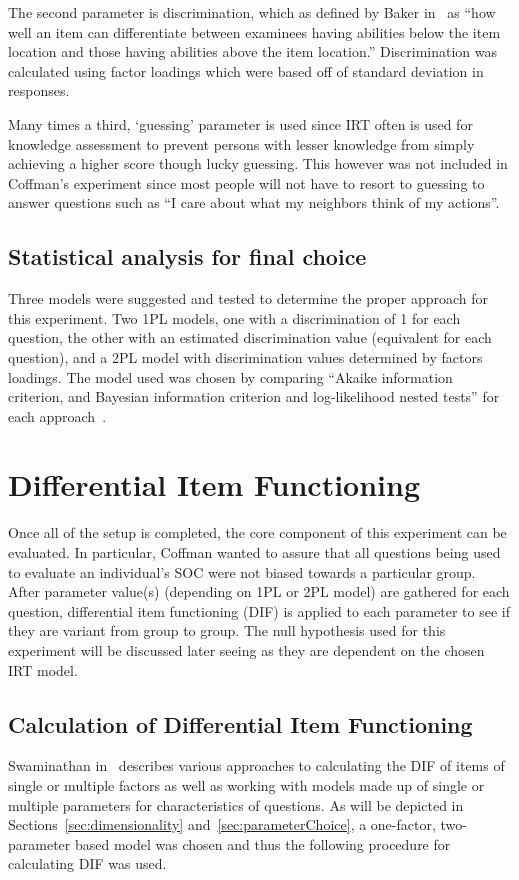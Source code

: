 \documentclass{sig-alternate}
\begin{document}
The second parameter is discrimination, which as defined by Baker in~\cite{irt:2001} as ``how well an item can differentiate between examinees having abilities below the item location and those having abilities above the item location.'' Discrimination was calculated using factor loadings which were based off of standard deviation in responses.

Many times a third, `guessing' parameter is used since IRT often is used for knowledge assessment to prevent persons with lesser knowledge from simply achieving a higher score though lucky guessing. This however was not included in Coffman's experiment since most people will not have to resort to guessing to answer questions such as ``I care about what my neighbors think of my actions''.

\subsection{Statistical analysis for final choice}
\label{sec:irtModel}
Three models were suggested and tested to determine the proper approach for this experiment. Two 1PL models, one with a discrimination of 1 for each question, the other with an estimated discrimination value (equivalent for each question), and a 2PL model with discrimination values determined by factors loadings. The model used was chosen by comparing ``Akaike information criterion, and Bayesian information criterion and log-likelihood nested tests'' for each approach~\cite{disparities:2009}.



\section{Differential Item Functioning}
\label{sec:dif}
Once all of the setup is completed, the core component of this experiment can be evaluated. In particular, Coffman wanted to assure that all questions being used to evaluate an individual's SOC were not biased towards a particular group. After parameter value(s) (depending on 1PL or 2PL model) are gathered for each question, differential item functioning (DIF) is applied to each parameter to see if they are variant from group to group. The null hypothesis used for this experiment will be discussed later seeing as they are dependent on the chosen IRT model.

\subsection{Calculation of Differential Item Functioning}
Swaminathan in~\cite{logisticDIF:1990} describes various approaches to calculating the DIF of items of single or multiple factors as well as working with models made up of single or multiple parameters for characteristics of questions. As will be depicted in Sections~\ref{sec:dimensionality} and~\ref{sec:parameterChoice}, a one-factor, two-parameter based model was chosen and thus the following procedure for calculating DIF was used. 
\end{document}
